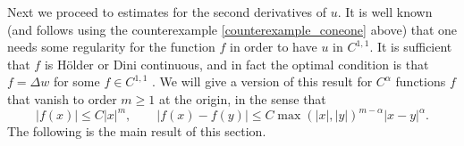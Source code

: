 \documentclass[11pt,a4paper]{amsart}
\theoremstyle{definition}
\numberwithin{equation}{section}
\begin{document}
Next we proceed to estimates for the second derivatives of $u$. It is well known (and follows using the counterexample \eqref{counterexample_coneone} above) that one needs some regularity for the function $f$ in order to have $u$ in $C^{1,1}$. It is sufficient that $f$ is H\"older or Dini continuous, and in fact the optimal condition is that $f = \Delta w$ for some $f \in C^{1,1}$ \cite{AnderssonLindgrenShahgholian}. We will give a version of this result for $C^{\alpha}$ functions $f$ that vanish to order $m \geq 1$ at the origin, in the sense that 
\begin{equation} \label{calpha_vanishing}
|f(x)| \leq C |x|^m, \qquad |f(x)-f(y)| \leq C \max(|x|,|y|)^{m-\alpha} |x-y|^{\alpha}.
\end{equation}
The following is the main result of this section.
\end{document}
